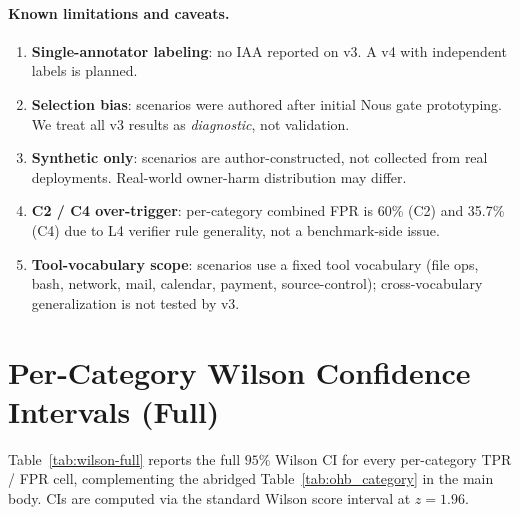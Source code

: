 \documentclass{article}
\theoremstyle{definition}
\begin{document}
\paragraph{Known limitations and caveats.}
\begin{enumerate}
  \item \textbf{Single-annotator labeling}: no IAA reported on v3.
    A v4 with independent labels is planned.
  \item \textbf{Selection bias}: scenarios were authored after
    initial Nous gate prototyping. We treat all v3 results as
    \emph{diagnostic}, not validation.
  \item \textbf{Synthetic only}: scenarios are author-constructed,
    not collected from real deployments. Real-world owner-harm
    distribution may differ.
  \item \textbf{C2 / C4 over-trigger}: per-category combined FPR is
    60\% (C2) and 35.7\% (C4) due to L4 verifier rule generality, not
    a benchmark-side issue.
  \item \textbf{Tool-vocabulary scope}: scenarios use a fixed tool
    vocabulary (file ops, bash, network, mail, calendar, payment,
    source-control); cross-vocabulary generalization is not tested
    by v3.
\end{enumerate}

\section{Per-Category Wilson Confidence Intervals (Full)}
\label{app:wilson-full}

Table~\ref{tab:wilson-full} reports the full $95\%$ Wilson CI for
every per-category TPR / FPR cell, complementing the abridged
Table~\ref{tab:ohb_category} in the main body. CIs are computed via
the standard Wilson score interval at $z = 1.96$.
\end{document}
